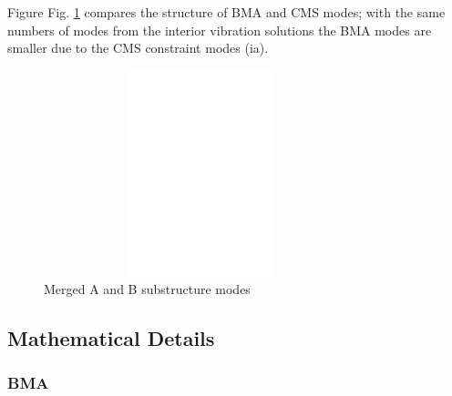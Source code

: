 \documentclass[11pt,openany,twoside]{book}
\numberwithin{equation}{section}		%
\newcommand{\Figref}[1]{Fig. \ref{#1}}  %
\begin{document}
Figure \Figref{fig:ss-phi} compares the structure of BMA and CMS modes;
with the same numbers of modes from the interior vibration solutions the BMA 
modes are smaller due to the CMS constraint modes (ia).
\begin{figure}
	\centering
	\includegraphics[height=6.0cm,width=9.0cm]{ss_phi.eps}
	\caption{Merged A and B substructure modes}\label{fig:ss-phi}
\end{figure}

\subsection{Mathematical Details}
\subsubsection{BMA}


\end{document}
